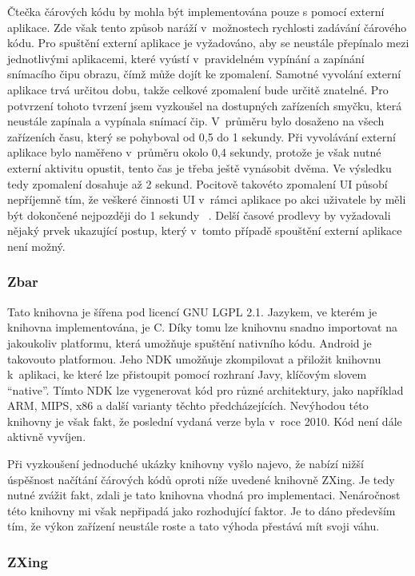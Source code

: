 \documentclass[thesis=B,czech]{FITthesis}[2013/10/20]
\begin{document}
Čtečka čárových kódu by mohla být implementována pouze s pomocí externí aplikace. Zde však tento způsob naráží v~možnostech rychlosti zadávání čárového kódu. Pro spuštění externí aplikace je vyžadováno, aby se neustále přepínalo mezi jednotlivými aplikacemi, které vyústí v~pravidelném vypínání a zapínání snímacího čipu obrazu, čímž může dojít ke zpomalení. Samotné vyvolání externí aplikace trvá určitou dobu, takže celkové zpomalení bude určitě znatelné. Pro potvrzení tohoto tvrzení jsem vyzkoušel na dostupných zařízeních smyčku, která neustále zapínala a vypínala snímací čip. V~průměru bylo dosaženo na všech zařízeních času, který se pohyboval od 0,5 do 1 sekundy. Při vyvolávání externí aplikace bylo naměřeno v~průměru okolo 0,4 sekundy, protože je však nutné externí aktivitu opustit, tento čas je třeba ještě vynásobit dvěma. Ve výsledku tedy zpomalení dosahuje až 2 sekund. Pocitově takovéto zpomalení UI působí nepříjemně tím, že veškeré činnosti UI v~rámci aplikace po akci uživatele by měli být dokončené nejpozději do 1 sekundy ~\cite{ui_maxlag}. Delší časové prodlevy by vyžadovali nějaký prvek ukazující postup, který v~tomto případě spouštění externí aplikace není možný.

\subsubsection{Zbar ~\cite{zbar}}

Tato knihovna je šířena pod licencí GNU LGPL 2.1. Jazykem, ve kterém je knihovna implementována, je C. Díky tomu lze knihovnu snadno importovat na jakoukoliv platformu, která umožňuje spuštění nativního kódu. Android je takovouto platformou. Jeho NDK umožňuje zkompilovat a přiložit knihovnu k~aplikaci, ke které lze přistoupit pomocí rozhraní Javy, klíčovým slovem ``native''. Tímto NDK lze vygenerovat kód pro různé architektury, jako například ARM, MIPS, x86 a další varianty těchto předcházejících. Nevýhodou této knihovny je však fakt, že poslední vydaná verze byla v~roce 2010. Kód není dále aktivně vyvíjen.

Při vyzkoušení jednoduché ukázky knihovny vyšlo najevo, že nabízí nižší úspěšnost načítání čárových kódů oproti níže uvedené knihovně ZXing. Je tedy nutné zvážit fakt, zdali je tato knihovna vhodná pro implementaci. Nenáročnost této knihovny mi však nepřipadá jako rozhodující faktor. Je to dáno především tím, že výkon zařízení neustále roste a tato výhoda přestává mít svoji váhu.

\subsubsection{ZXing ~\cite{zxing}}
\end{document}
